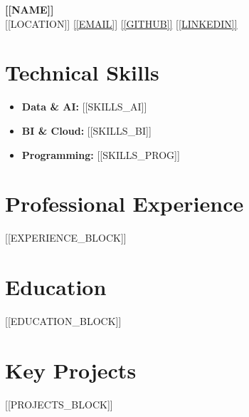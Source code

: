 ﻿\documentclass[11pt,a4paper]{article}
\begin{document}
\begin{center}
    {\Huge \textbf{[[NAME]]}} \\ \vspace{6pt}
    [[LOCATION]] \textbar{} \href{mailto:[[EMAIL]]}{[[EMAIL]]} \textbar{} \href{https://[[GITHUB]]}{[[GITHUB]]} \textbar{} \href{https://[[LINKEDIN]]}{[[LINKEDIN]]}
\end{center}

\section*{Technical Skills}
\begin{itemize}[leftmargin=0.15in, label={}, itemsep=2pt, parsep=0pt, topsep=0pt]
    \item \textbf{Data \& AI:} [[SKILLS_AI]]
    \item \textbf{BI \& Cloud:} [[SKILLS_BI]]
    \item \textbf{Programming:} [[SKILLS_PROG]]
\end{itemize}

\section*{Professional Experience}
[[EXPERIENCE_BLOCK]]

\section*{Education}
[[EDUCATION_BLOCK]]

\section*{Key Projects}
[[PROJECTS_BLOCK]]
\end{document}
